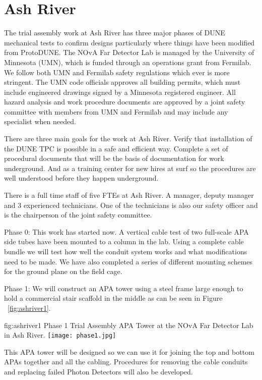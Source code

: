 \section{Ash River}

The trial assembly work at Ash River has three major phases of DUNE
mechanical tests to confirm designs particularly where things have
been modified from ProtoDUNE.  The NOvA Far Detector Lab is managed by
the University of Minnesota (UMN), which is funded through an
operations grant from Fermilab.  We follow both UMN and Fermilab
safety regulations which ever is more stringent.  The UMN code
officials approves all building permits, which must include engineered
drawings signed by a Minnesota registered engineer. All hazard
analysis and work procedure documents are approved by a joint safety
committee with members from UMN and Fermilab and may include any
specialist when needed.

There are three main goals for the work at Ash River. Verify that
installation of the DUNE TPC is possible in a safe and efficient
way. Complete a set of procedural documents that will be the basis of
documentation for work underground.  And as a training center for new
hires at {surf} so the procedures are well understood before they happen
underground.

There is a full time staff of five FTEs at Ash River. A manager,
deputy manager and 3 experienced technicians.  One of the technicians
is also our safety officer and is the chairperson of the joint safety
committee.


Phase 0: This work has started now.  A vertical cable test of two
full-scale APA side tubes have been mounted to a column in the
lab. Using a complete cable bundle we will test how well the conduit
system works and what modifications need to be made. We have also
completed a series of different mounting schemes for the ground plane
on the field cage.

Phase 1: We will construct an APA tower using a steel frame large
enough to hold a commercial stair scaffold in the middle as can be
seen in Figure ~\ref{fig:ashriver1}.
\begin{dunefigure}{fig:ashriver1}
  {Phase 1 Trial Assembly APA Tower at the NOvA Far Detector Lab in Ash River.}
  \texttt{[image: phase1.jpg]}
\end{dunefigure}
This APA tower will be designed so we can
use it for joining the top and bottom APAs together and all the
cabling. Procedures for removing the cable conduits and replacing
failed Photon Detectors will also be developed.

